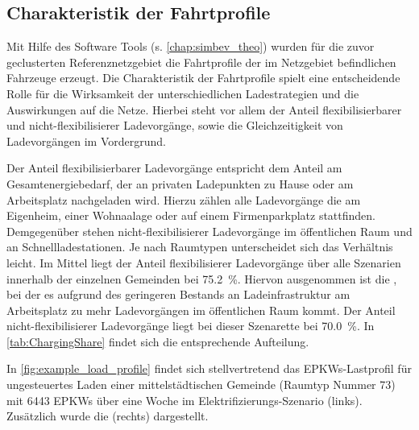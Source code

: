 





\subsection{Charakteristik der Fahrtprofile}



Mit Hilfe des Software Tools \simbev (s. \autoref{chap:simbev_theo}) wurden für die zuvor geclusterten Referenznetzgebiet die Fahrtprofile der im Netzgebiet befindlichen Fahrzeuge erzeugt.
Die Charakteristik der Fahrtprofile spielt eine entscheidende Rolle für die Wirksamkeit der unterschiedlichen Ladestrategien und die Auswirkungen auf die Netze.
Hierbei steht vor allem der Anteil flexibilisierbarer und nicht-flexibilisierer Ladevorgänge, sowie die Gleichzeitigkeit von Ladevorgängen im Vordergrund.\medskip

Der Anteil flexibilisierbarer Ladevorgänge entspricht dem Anteil am Gesamtenergiebedarf, der an privaten Ladepunkten zu Hause oder am Arbeitsplatz nachgeladen wird.
Hierzu zählen alle Ladevorgänge die am Eigenheim, einer Wohnaalage oder auf einem Firmenparkplatz stattfinden.
Demgegenüber stehen nicht-flexibilisierer Ladevorgänge im öffentlichen Raum und an Schnellladestationen.
Je nach Raumtypen unterscheidet sich das Verhältnis leicht.
Im Mittel liegt der Anteil flexibilisierer Ladevorgänge über alle Szenarien innerhalb der einzelnen Gemeinden bei \SI{75.2}{\percent}.
Hiervon ausgenommen ist die \SzeFirmenparkplatzdot, bei der es aufgrund des geringeren Bestands an Ladeinfrastruktur am Arbeitsplatz zu mehr Ladevorgängen im öffentlichen Raum kommt.
Der Anteil nicht-flexibilisierer Ladevorgänge liegt bei dieser Szenarette bei \SI{70.0}{\percent}.
In \autoref{tab:ChargingShare} findet sich die entsprechende Aufteilung.



In \autoref{fig:example_load_profile} findet sich stellvertretend das \glspl{EPKW}-Lastprofil für ungesteuertes Laden einer mittelstädtischen Gemeinde (Raumtyp Nummer \num{73}) mit \num{6443} \glspl{EPKW} über eine Woche im Elektrifizierungs-Szenario (links).
Zusätzlich wurde die \SzeFirmenparkplatz (rechts) dargestellt.

